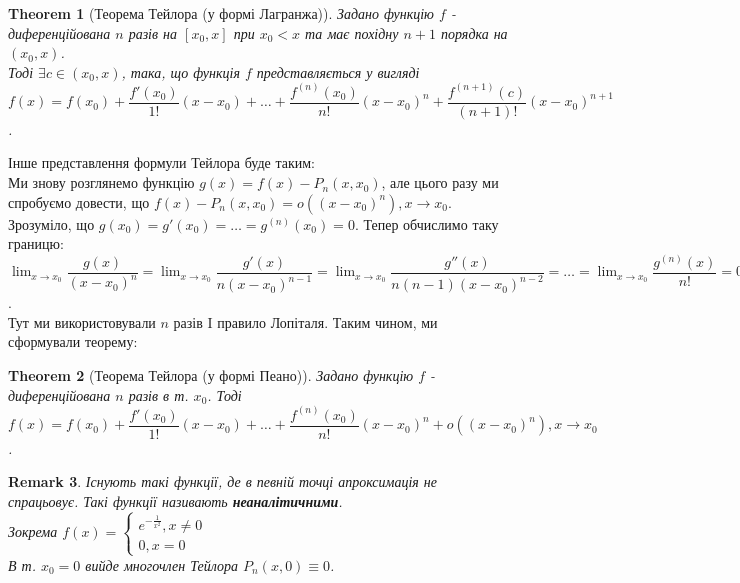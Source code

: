 \documentclass[a4paper, 14pt]{article}
\def\huge{\displaystyle}
\theoremstyle{theoremdd}
\newtheorem{theorem}{Theorem}[subsection]
\theoremstyle{theoremdd}
\theoremstyle{theoremdd}
\theoremstyle{theoremdd}
\theoremstyle{theoremdd}
\theoremstyle{theoremdd}
\newtheorem{remark}[theorem]{Remark}
\theoremstyle{theoremdd}
\theoremstyle{theoremdd}
\begin{document}
\begin{theorem}[Теорема Тейлора (у формі Лагранжа)]
Задано функцію $f$ - диференційована $n$ разів на $[x_0,x]$ при $x_0 < x$ та має похідну $n+1$ порядка на $(x_0,x)$.\\
Тоді $\exists c \in (x_0,x)$, така, що функція $f$ представляється у вигляді\\
$f(x) = f(x_0) + \dfrac{f'(x_0)}{1!}(x-x_0) + \dots + \dfrac{f^{(n)}(x_0)}{n!}(x-x_0)^n + \dfrac{f^{(n+1)}(c)}{(n+1)!}(x-x_0)^{n+1}$.
\end{theorem}
Інше представлення формули Тейлора буде таким:\\
Ми знову розглянемо функцію $g(x) = f(x) - P_n(x,x_0)$, але цього разу ми спробуємо довести, що $f(x) - P_n(x,x_0) = o((x-x_0)^n), x \to x_0$.\\
Зрозуміло, що $g(x_0) = g'(x_0) = \dots = g^{(n)}(x_0) = 0$. Тепер обчислимо таку границю:\\
$\huge\lim_{x \to x_0} \dfrac{g(x)}{(x-x_0)^n} = \lim_{x \to x_0} \dfrac{g'(x)}{n(x-x_0)^{n-1}} = \lim_{x \to x_0} \dfrac{g''(x)}{n(n-1)(x-x_0)^{n-2}} = \dots = \lim_{x \to x_0} \dfrac{g^{(n)}(x)}{n!} = 0$.\\
Тут ми використовували $n$ разів I правило Лопіталя. Таким чином, ми сформували теорему:
\begin{theorem}[Теорема Тейлора (у формі Пеано)]
Задано функцію $f$ - диференційована $n$ разів в т. $x_0$. Тоді \\
$f(x) = f(x_0) + \dfrac{f'(x_0)}{1!}(x-x_0) + \dots + \dfrac{f^{(n)}(x_0)}{n!}(x-x_0)^n + o((x-x_0)^n), x \to x_0$.
\end{theorem}

\begin{remark}
Існують такі функції, де в певній точці апроксимація не спрацьовує. Такі функції називають \textbf{неаналітичними}.\\
Зокрема $f(x) = \begin{cases} e^{\textstyle -\frac{1}{x^2}}, x \neq 0 \\ 0, x = 0 \end{cases}$\\
В т. $x_0 = 0$ вийде многочлен Тейлора $P_n(x,0) \equiv 0$.\\
\begin{figure}[H]
\centering
{}
\end{figure}
\end{remark}
\end{document}
